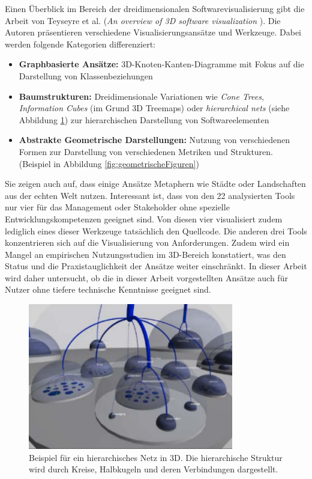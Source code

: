 Einen Überblick im Bereich der dreidimensionalen Softwarevisualisierung gibt die Arbeit von Teyseyre et al. (\textit{An overview of 3D software visualization} \cite{overview3D}). Die Autoren präsentieren verschiedene Visualisierungsansätze und Werkzeuge. Dabei werden folgende Kategorien differenziert:
\begin{itemize}
\item \textbf{Graphbasierte Ansätze:} 3D-Knoten-Kanten-Diagramme mit Fokus auf die Darstellung von Klassenbeziehungen
\item \textbf{Baumstrukturen:} Dreidimensionale Variationen wie \textit{Cone Trees}, \textit{Information Cubes} (im Grund 3D Treemaps) oder \textit{hierarchical nets} (siehe Abbildung \ref{fig:hierarchicalNet3D}) zur hierarchischen Darstellung von Softwareelementen
\item \textbf{Abstrakte Geometrische Darstellungen:} Nutzung von verschiedenen Formen zur Darstellung von verschiedenen Metriken und Strukturen. (Beispiel in Abbildung \ref{fig:geometrischeFiguren})
\end{itemize}
Sie zeigen auch auf, dass einige Ansätze Metaphern wie Städte oder Landschaften aus der echten Welt nutzen.
Interessant ist, dass von den 22 analysierten Tools nur vier für das Management oder Stakeholder ohne spezielle Entwicklungskompetenzen geeignet sind. Von diesen vier visualisiert zudem lediglich eines dieser Werkzeuge tatsächlich den Quellcode. Die anderen drei Tools konzentrieren sich auf die Visualisierung von Anforderungen. Zudem wird ein Mangel an empirischen Nutzungsstudien im 3D-Bereich konstatiert, was den Status und die Praxistauglichkeit der Ansätze weiter einschränkt. \cite{overview3D} In dieser Arbeit wird daher untersucht, ob die in dieser Arbeit vorgestellten Ansätze auch für Nutzer ohne tiefere technische Kenntnisse geeignet sind.

\begin{figure}
    \centering
    \includegraphics[width=0.8\textwidth]{images/verwandte/hierarchicalNet3D.png}
    \caption{Beispiel für ein hierarchisches Netz in 3D. Die hierarchische Struktur wird durch Kreise, Halbkugeln und deren Verbindungen dargestellt. \cite[6]{overview3D}}
    \label{fig:hierarchicalNet3D}
\end{figure}

